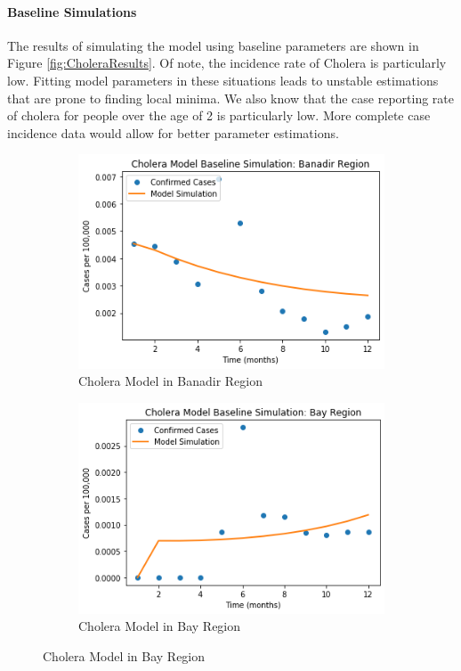 \documentclass[letter,12pt, usenames,dvipsnames]{article}
\begin{document}
\paragraph{Baseline Simulations}
The results of simulating the model using baseline parameters are shown in Figure \ref{fig:CholeraResults}.  Of note, the incidence rate of Cholera is particularly low.  Fitting model parameters in these situations leads to unstable estimations that are prone to finding local minima.  We also know that the case reporting rate of cholera for people over the age of 2 is particularly low.  More complete case incidence data would allow for better parameter estimations.


\begin{figure}[h!]
     \centering
     \begin{subfigure}[b]{0.45\textwidth}
         \centering
         \includegraphics[width=\textwidth]{CholeraBanadir.png}
         \caption{Cholera Model in Banadir Region}
     \end{subfigure}
     \hfill
     \begin{subfigure}[b]{0.45\textwidth}
         \centering
         \includegraphics[width=\textwidth]{CholeraBay.png}
         \caption{Cholera Model in Bay Region}


\end{subfigure}
\end{figure}
\end{document}

